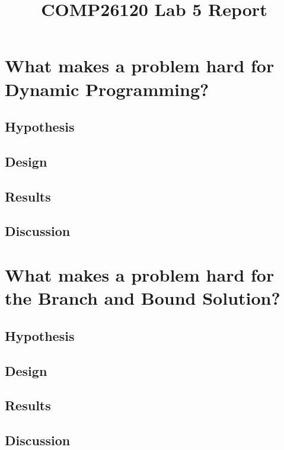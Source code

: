 \documentclass[a4]{article}
\title{COMP26120 Lab 5 Report}
\author{}
\begin{document}
\maketitle

\section{What makes a problem hard for Dynamic Programming?}

\subsection{Hypothesis}
\subsection{Design}
\subsection{Results}
\subsection{Discussion}

\section{What makes a problem hard for the Branch and Bound Solution?}

\subsection{Hypothesis}
\subsection{Design}
\subsection{Results}
\subsection{Discussion}


\appendix

\end{document}
